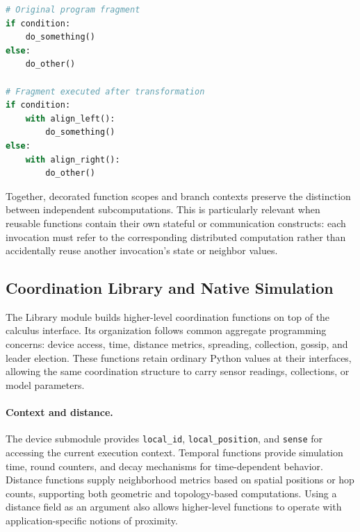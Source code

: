 \begin{lstlisting}[language=Python,breaklines=true,
  caption={Schematic transformation of a Python conditional for alignment.},
  label={lst:phyelds-alignment}]
# Original program fragment
if condition:
    do_something()
else:
    do_other()

# Fragment executed after transformation
if condition:
    with align_left():
        do_something()
else:
    with align_right():
        do_other()
\end{lstlisting}

Together, decorated function scopes and branch contexts preserve the
 distinction between independent subcomputations.
%
This is particularly relevant when reusable functions contain their own
 stateful or communication constructs: each invocation must refer to the
 corresponding distributed computation rather than accidentally reuse
 another invocation's state or neighbor values.

\subsection{Coordination Library and Native Simulation}
\label{sec:phyelds-library}

The Library module builds higher-level coordination functions on top of the
 calculus interface.
%
Its organization follows common aggregate programming concerns:
 device access, time, distance metrics, spreading, collection, gossip,
 and leader election.
%
These functions retain ordinary Python values at their interfaces,
 allowing the same coordination structure to carry sensor readings,
 collections, or model parameters.

\paragraph{Context and distance.}
The device submodule provides \texttt{local\_\allowbreak id}, \texttt{local\_\allowbreak position},
 and \texttt{sense} for accessing the current execution context.
%
Temporal functions provide simulation time, round counters, and decay
 mechanisms for time-dependent behavior.
%
Distance functions supply neighborhood metrics based on spatial positions
 or hop counts, supporting both geometric and topology-based computations.
%
Using a distance field as an argument also allows higher-level functions
 to operate with application-specific notions of proximity.

